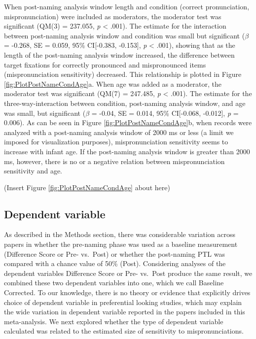 \documentclass[
  english,
  man, noextraspace]{apa6}
\begin{document}
When post-naming analysis window length and condition (correct pronunciation, mispronunciation) were included as moderators, the moderator test was significant (QM(3) = 237.055, \emph{p} \textless{} .001). The estimate for the interaction between post-naming analysis window and condition was small but significant (\(\beta\) = -0.268, SE = 0.059, 95\% CI{[}-0.383, -0.153{]}, \emph{p} \textless{} .001), showing that as the length of the post-naming analysis window increased, the difference between target fixations for correctly pronounced and mispronounced items (mispronunciation sensitivity) decreased. This relationship is plotted in Figure \ref{fig:PlotPostNameCondAge}a. When age was added as a moderator, the moderator test was significant (QM(7) = 247.485, \emph{p} \textless{} .001). The estimate for the three-way-interaction between condition, post-naming analysis window, and age was small, but significant (\(\beta\) = -0.04, SE = 0.014, 95\% CI{[}-0.068, -0.012{]}, \emph{p} = 0.006). As can be seen in Figure \ref{fig:PlotPostNameCondAge}b, when records were analyzed with a post-naming analysis window of 2000 ms or less (a limit we imposed for visualization purposes), mispronunciation sensitivity seems to increase with infant age. If the post-naming analysis window is greater than 2000 ms, however, there is no or a negative relation between mispronunciation sensitivity and age.

(Insert Figure \ref{fig:PlotPostNameCondAge} about here)

\hypertarget{dependent-variable}{%
\subsection{Dependent variable}\label{dependent-variable}}

As described in the Methods section, there was considerable variation across papers in whether the pre-naming phase was used as a baseline measurement (Difference Score or Pre- vs.~Post) or whether the post-naming PTL was compared with a chance value of 50\% (Post). Considering analyses of the dependent variables Difference Score or Pre- vs.~Post produce the same result, we combined these two dependent variables into one, which we call Baseline Corrected. To our knowledge, there is no theory or evidence that explicitly drives choice of dependent variable in preferential looking studies, which may explain the wide variation in dependent variable reported in the papers included in this meta-analysis. We next explored whether the type of dependent variable calculated was related to the estimated size of sensitivity to mispronunciations.
\end{document}
